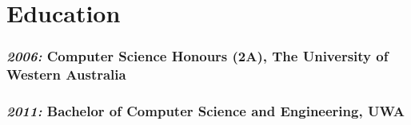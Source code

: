 \documentclass[10pt, a4paper]{report}
\newcommand{\engineering}[1]{}
\renewcommand{\engineering}[1]{#1}
\begin{document}
\begin{minipage}[t]{14.5cm}
\section*{Education}
\subsubsection*{{\em 2006:} Computer Science Honours (2A), The University of Western Australia}
\subsubsection*{{\em 2011:} Bachelor of Computer Science and Engineering, UWA}

%


\end{minipage}
\end{document}

